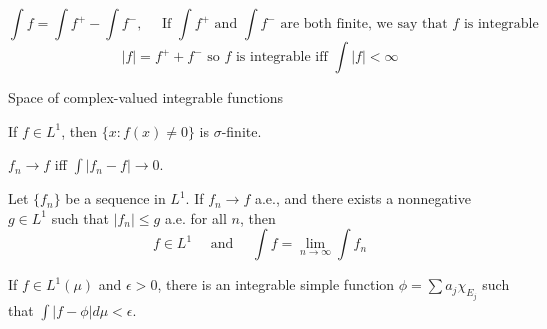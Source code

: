 \begin{dfn}[integrable] 
	\[
	\int f = \int f^+ - \int f^-,  \quad \text{ If } \int f^+ \text{ and } \int f ^- \text{ are both finite, we say that $f$ is integrable } 
	\]
\[
|f|= f^+ + f^- \text{ so $f$ is integrable iff } \int |f| < \infty 
\]
	
\end{dfn}


\begin{dfn}[$L^1$]
	Space of complex-valued integrable functions				
\end{dfn}

\begin{prop}
If $f \in L^1$, then $\{ x : f(x) \neq 0 \}$ is $\sigma$-finite.	
\end{prop}

\begin{dfn}[convergence in $L^1$] $f_n \rightarrow f$ iff $\int |f_n - f| \rightarrow 0$.  
\end{dfn}

\begin{thm}
	Let $\{f_n \}$ be a sequence in $L^1$. If $f_n \rightarrow f$ a.e., and there exists a nonnegative $g \in L^1$ such that $|f_n| \leq g$ a.e. for all $n$, then 
	\[
	f \in L^1 \quad \text{ and } \quad \int f = \lim_{n \rightarrow \infty} \int f_n
	\]
\end{thm}
\begin{thm}
If $f \in L^1( \mu)$ and $\epsilon>0$, there is an integrable simple function $\phi = \sum a_j \chi_{E_j}$ such that $\int |f - \phi| d \mu < \epsilon$.	
\end{thm}

